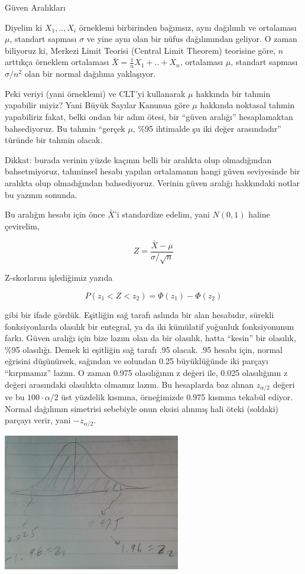 \documentclass[12pt,fleqn]{article}\usepackage{../../common}
\begin{document}
Güven Aralıkları

Diyelim ki $X_1,..,X_i$ örneklemi birbirinden bağımsız, aynı dağılımlı ve
ortalaması $\mu$, standart sapması $\sigma$ ve yine aynı olan bir nüfus
dağılımından geliyor. O zaman biliyoruz ki, Merkezi Limit Teorisi (Central
Limit Theorem) teorisine göre, $n$ arttıkça örneklem ortalaması $\bar{X} =
\frac{1}{n} X_1+..+X_n$, ortalaması $\mu$, standart sapması $\sigma/n^2$
olan bir normal dağılıma yaklaşıyor.

Peki veriyi (yani örneklemi) ve CLT'yi kullanarak $\mu$ hakkında bir tahmin
yapabilir miyiz? Yani Büyük Sayılar Kanunua göre $\mu$ hakkında noktasal
tahmin yapabiliriz fakat, belki ondan bir adım ötesi, bir ``güven aralığı''
hesaplamaktan bahsediyoruz. Bu tahmin ``gerçek $\mu$, \%95 ihtimalde şu iki
değer arasındadır'' türünde bir tahmin olacak.

Dikkat: burada verinin yüzde kaçının belli bir aralıkta olup olmadığından
bahsetmiyoruz, tahminsel hesabı yapılan ortalamanın hangi güven seviyesinde
bir aralıkta olup olmadığından bahsediyoruz. Verinin güven aralığı
hakkındaki notlar bu yazının sonunda.

Bu aralığın hesabı için önce $\bar{X}$'i standardize edelim, yani $N(0,1)$
haline çevirelim,

$$ Z = \frac{\bar{X} - \mu}{\sigma / \sqrt{n}} $$

Z-skorlarını işlediğimiz yazıda 

$$
P(z_1 < Z < z_2) =  \Phi(z_1) - \Phi(z_2) 
$$

gibi bir ifade gördük. Eşitliğin sağ tarafı aslında bir alan hesabıdır,
sürekli fonksiyonlarda olasılık bir entegral, ya da iki kümülatif yoğunluk
fonksiyonunun farkı. Güven aralığı için bize lazım olan da bir olasılık,
hatta ``kesin'' bir olasılık, \%95 olasılığı. Demek ki eşitliğin sağ tarafı
.95 olacak. .95 hesabı için, normal eğrisini düşünürsek, sağından ve
solundan 0.25 büyüklüğünde iki parçayı ``kırpmamız'' lazım. O zaman 0.975
olasılığının z değeri ile, 0.025 olasılığının z değeri arasındaki
olasılıkta olmamız lazım. Bu hesaplarda baz alınan $z_{\alpha/2}$ değeri ve
bu $100 \cdot \alpha / 2$ üst yüzdelik kısmına, örneğimizde 0.975 kısmına
tekabül ediyor. Normal dağılımın simetrisi sebebiyle onun eksisi alınmış
hali öteki (soldaki) parçayı verir, yani $-z_{\alpha/2}$. 

\includegraphics[height=6cm]{stat_ci_03.png}
\end{document}
